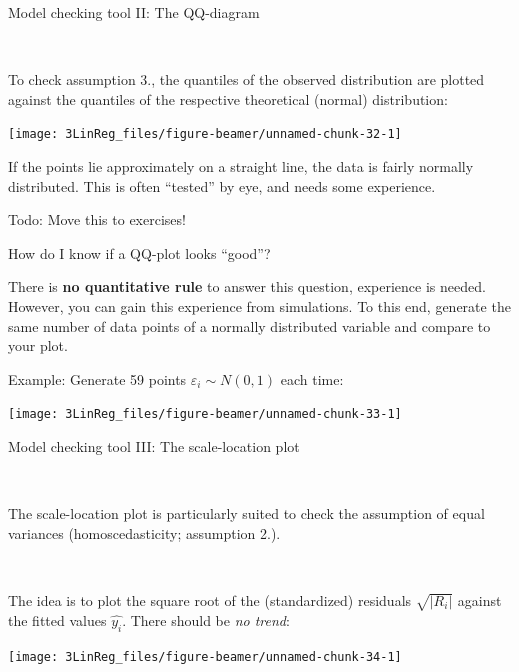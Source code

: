 \documentclass[10pt,ignorenonframetext,]{beamer}
\begin{document}
\begin{frame}

\begin{block}{Model checking tool II: The QQ-diagram}

\(~\)

To check assumption 3., the quantiles of the observed distribution are
plotted against the quantiles of the respective theoretical (normal)
distribution:

\begin{center}\texttt{[image: 3LinReg\_files/figure-beamer/unnamed-chunk-32-1]} \end{center}

If the points lie approximately on a straight line, the data is fairly
normally distributed. This is often ``tested'' by eye, and needs some
experience.

\end{block}

\end{frame}

\begin{frame}{Todo: Move this to exercises!}

\begin{block}{How do I know if a QQ-plot looks ``good''?}

There is \textbf{no quantitative rule} to answer this question,
experience is needed. However, you can gain this experience from
simulations. To this end, generate the same number of data points of a
normally distributed variable and compare to your plot.

Example: Generate 59 points \(\varepsilon_i \sim N(0,1)\) each time:

\begin{center}\texttt{[image: 3LinReg\_files/figure-beamer/unnamed-chunk-33-1]} \end{center}

\end{block}

\end{frame}

\begin{frame}

\begin{block}{Model checking tool III: The scale-location plot}

\(~\)

The scale-location plot is particularly suited to check the assumption
of equal variances (homoscedasticity; assumption 2.).

\(~\)

The idea is to plot the square root of the (standardized) residuals
\(\sqrt{|R_i|}\) against the fitted values \(\hat{y_i}\). There should
be \emph{no trend}:

\begin{center}\texttt{[image: 3LinReg\_files/figure-beamer/unnamed-chunk-34-1]} \end{center}

\end{block}

\end{frame}
\end{document}
